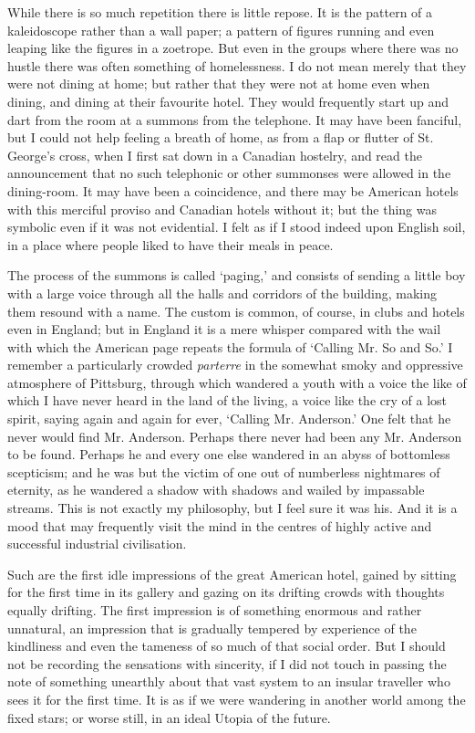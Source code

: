 \documentclass{book}
\begin{document}
While there is so much repetition there is little repose. It is the pattern of a kaleidoscope rather than a wall paper; a pattern of figures running and even leaping like the figures in a zoetrope. But even in the groups where there was no hustle there was often something of homelessness. I do not mean merely that they were not dining at home; but rather that they were not at home even when dining, and dining at their favourite hotel. They would frequently start up and dart from the room at a summons from the telephone. It may have been fanciful, but I could not help feeling a breath of home, as from a flap or flutter of St. George’s cross, when I first sat down in a Canadian hostelry, and read the announcement that no such telephonic or other summonses were allowed in the dining-room. It may have been a coincidence, and there may be American hotels with this merciful proviso and Canadian hotels without it; but the thing was symbolic even if it was not evidential. I felt as if I stood indeed upon English soil, in a place where people liked to have their meals in peace.

The process of the summons is called ‘paging,’ and consists of sending a little boy with a large voice through all the halls and corridors of the building, making them resound with a name. The custom is common, of course, in clubs and hotels even in England; but in England it is a mere whisper compared with the wail with which the American page repeats the formula of ‘Calling Mr. So and So.’ I remember a particularly crowded \emph{parterre} in the somewhat smoky and oppressive atmosphere of Pittsburg, through which wandered a youth with a voice the like of which I have never heard in the land of the living, a voice like the cry of a lost spirit, saying again and again for ever, ‘Calling Mr. Anderson.’ One felt that he never would find Mr. Anderson. Perhaps there never had been any Mr. Anderson to be found. Perhaps he and every one else wandered in an abyss of bottomless scepticism; and he was but the victim of one out of numberless nightmares of eternity, as he wandered a shadow with shadows and wailed by impassable streams. This is not exactly my philosophy, but I feel sure it was his. And it is a mood that may frequently visit the mind in the centres of highly active and successful industrial civilisation.

Such are the first idle impressions of the great American hotel, gained by sitting for the first time in its gallery and gazing on its drifting crowds with thoughts equally drifting. The first impression is of something enormous and rather unnatural, an impression that is gradually tempered by experience of the kindliness and even the tameness of so much of that social order. But I should not be recording the sensations with sincerity, if I did not touch in passing the note of something unearthly about that vast system to an insular traveller who sees it for the first time. It is as if we were wandering in another world among the fixed stars; or worse still, in an ideal Utopia of the future.
\end{document}
